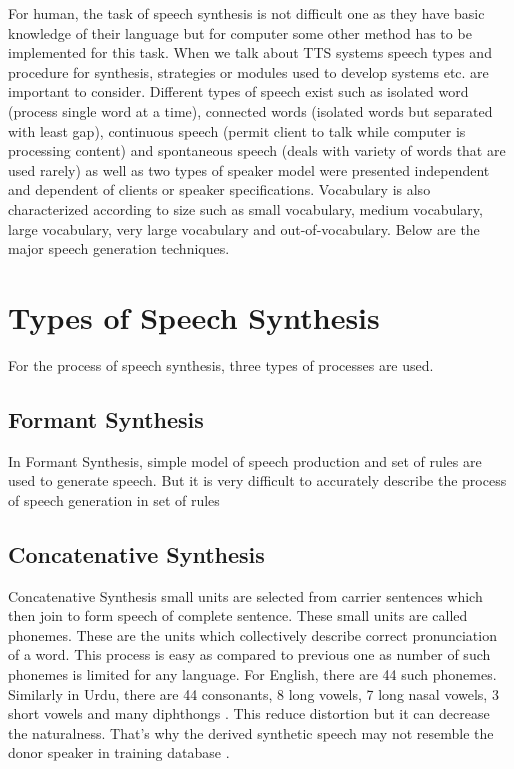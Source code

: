For human, the task of speech synthesis is not difficult one as they have basic knowledge of their
language but for computer some
other method has to be implemented for this task. When we talk about TTS systems speech types
and procedure for synthesis, strategies or modules used to develop systems etc. are important to
consider. Different types of speech exist such as isolated word (process single word at a time),
connected words (isolated words but separated with least gap), continuous speech (permit client
to talk while computer is processing content) and spontaneous speech (deals with variety of words
that are used rarely) as well as two types of speaker model were presented independent and
dependent of clients or speaker specifications. Vocabulary is also characterized according to size
such as small vocabulary, medium vocabulary, large vocabulary, very large vocabulary and out-of-vocabulary.
Below are the major speech generation techniques.

\section{Types of Speech Synthesis}
For the process of speech synthesis, three types of processes are used.

\subsection{Formant Synthesis}
In Formant Synthesis, simple model of speech production and set of rules are used to generate
speech. But it is very difficult to accurately describe the process of speech generation in set of
rules

\subsection{Concatenative Synthesis}
Concatenative Synthesis small units are selected from carrier sentences which then join to form
speech of complete sentence. These small units are called phonemes. These are the units which
collectively describe correct pronunciation of a word. This process is easy as compared to previous one
as number of such phonemes is limited for any language. For English, there are 44 such phonemes.
Similarly in Urdu, there are 44 consonants, 8 long vowels, 7 long nasal vowels, 3 short vowels and many
diphthongs \cite{saleem2002urdu}. This reduce distortion but it can decrease the naturalness.
That’s why the derived synthetic speech may not resemble the donor speaker in training database \cite{huang1996whistler}.

